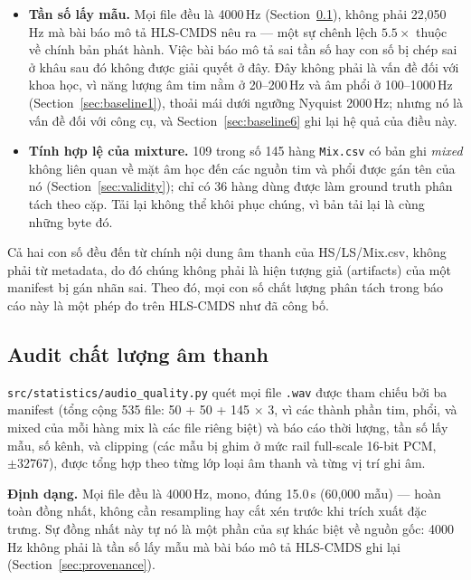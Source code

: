 \documentclass[11pt]{article}
\begin{document}
\begin{itemize}
  \item \textbf{Tần số lấy mẫu.} Mọi file đều là 4000\,Hz
    (Section~\ref{sec:audioquality}), không phải 22{,}050\,Hz mà bài báo
    mô tả HLS-CMDS nêu ra --- một sự chênh lệch $5.5\times$ thuộc về
    chính bản phát hành. Việc bài báo mô tả sai tần số hay con số bị chép
    sai ở khâu sau đó không được giải quyết ở đây. Đây không phải là vấn
    đề đối với khoa học, vì năng lượng âm tim nằm ở 20--200\,Hz và âm
    phổi ở 100--1000\,Hz (Section~\ref{sec:baseline1}), thoải mái dưới
    ngưỡng Nyquist 2000\,Hz; nhưng nó là vấn đề đối với công cụ, và
    Section~\ref{sec:baseline6} ghi lại hệ quả của điều này.
  \item \textbf{Tính hợp lệ của mixture.} 109 trong số 145 hàng
    \texttt{Mix.csv} có bản ghi \emph{mixed} không liên quan về mặt âm
    học đến các nguồn tim và phổi được gán tên của nó
    (Section~\ref{sec:validity}); chỉ có 36 hàng dùng được làm ground
    truth phân tách theo cặp. Tải lại không thể khôi phục chúng, vì bản
    tải lại là cùng những byte đó.
\end{itemize}

Cả hai con số đều đến từ chính nội dung âm thanh của HS/LS/Mix.csv, không
phải từ metadata, do đó chúng không phải là hiện tượng giả (artifacts)
của một manifest bị gán nhãn sai. Theo đó, mọi con số chất lượng phân
tách trong báo cáo này là một phép đo trên HLS-CMDS như đã công bố.

\subsection{Audit chất lượng âm thanh}
\label{sec:audioquality}

\texttt{src/statistics/audio\_quality.py} quét mọi file \texttt{.wav}
được tham chiếu bởi ba manifest (tổng cộng 535 file: 50 + 50 + 145
$\times$ 3, vì các thành phần tim, phổi, và mixed của mỗi hàng mix là các
file riêng biệt) và báo cáo thời lượng, tần số lấy mẫu, số kênh, và
clipping (các mẫu bị ghim ở mức rail full-scale 16-bit PCM,
$\pm 32767$), được tổng hợp theo từng lớp loại âm thanh và từng vị trí
ghi âm.

\textbf{Định dạng.} Mọi file đều là 4000\,Hz, mono, đúng 15.0\,s
(60{,}000 mẫu) --- hoàn toàn đồng nhất, không cần resampling hay cắt
xén trước khi trích xuất đặc trưng. Sự đồng nhất này tự nó là một phần
của sự khác biệt về nguồn gốc: 4000\,Hz không phải là tần số lấy mẫu mà
bài báo mô tả HLS-CMDS ghi lại (Section~\ref{sec:provenance}).
\end{document}
